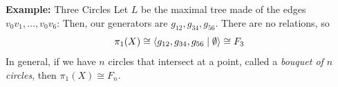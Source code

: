\begin{example}{\textbf{Example:} Three Circles}
    Let $L$ be the maximal tree made of the edges $v_0 v_1, \ldots, v_0 v_6$:
    Then, our generators are $g_{12}, g_{34}, g_{56}$. There are no relations, so
    \[ \pi_1(X) \cong \left\langle {g_{12}, g_{34}, g_{56} \mid \emptyset} \right\rangle \cong F_3 \]
    In general, if we have $n$ circles that intersect at a point, called a \emph{bouquet of $n$ circles}, then $\pi_1(X) \cong F_n$.
\end{example}
